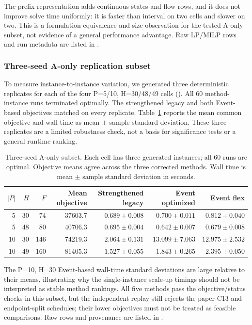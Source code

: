 The prefix representation adds continuous states and flow rows, and it does
not improve solve time uniformly: it is faster than interval on two cells and
slower on two. This is a formulation-equivalence and size observation for the
tested A-only subset, not evidence of a general performance advantage. Raw
LP/MILP rows and run metadata are listed in .

\subsubsection{Three-seed A-only replication subset}

To measure instance-to-instance variation, we generated three deterministic
replicates for each of the four P=5/10, H=30/48/49 cells (). All 60 method-instance runs
terminated optimally. The strengthened legacy and both Event-based objectives
matched on every replicate. Table~\ref{tab:a_only_multiseed} reports the mean
common objective and wall time as mean $\pm$ sample standard deviation. These
three replicates are a limited robustness check, not a basis for significance
tests or a general runtime ranking.

\begin{table}[t]
\centering\scriptsize
\caption{Three-seed A-only subset. Each cell has three generated instances;
all 60 runs are optimal. Objective means agree across the three corrected
methods. Wall time is mean $\pm$ sample standard deviation in seconds.}
\label{tab:a_only_multiseed}
\begin{tabular}{rrr r rrr}
\toprule
$|P|$ & $H$ & $F$ & Mean objective & Strengthened legacy & Event optimized & Event flex \\
\midrule
5 & 30 & 74 & 37603.7 & $0.689\pm0.008$ & $0.700\pm0.011$ & $0.812\pm0.040$ \\
5 & 48 & 80 & 40706.3 & $0.695\pm0.004$ & $0.642\pm0.007$ & $0.679\pm0.008$ \\
10 & 30 & 146 & 74219.3 & $2.064\pm0.131$ & $13.099\pm7.063$ & $12.975\pm2.532$ \\
10 & 49 & 160 & 81405.3 & $1.527\pm0.055$ & $1.843\pm0.265$ & $2.395\pm0.050$ \\
\bottomrule
\end{tabular}
\end{table}

The P=10, H=30 Event-based wall-time standard deviations are large relative
to their means, illustrating why the single-instance scale-up timings should
not be interpreted as stable method rankings. All five methods pass the
objective/status checks in this subset, but the independent replay still
rejects the paper-C13 and endpoint-split schedules; their lower objectives
must not be treated as feasible comparisons. Raw rows and provenance are listed in
.

